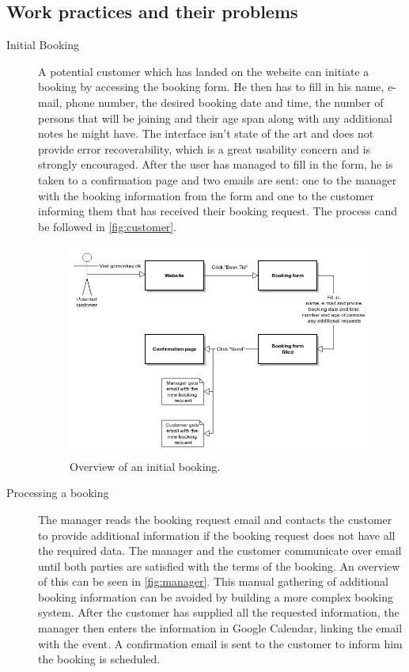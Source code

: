 \subsection{Work practices and their problems}
\begin{description}
\item[Initial Booking]
A potential customer which has landed on the website can initiate a booking
by accessing the booking form. He then has to fill in his name, e-mail, phone number, 
the desired booking date and time, the number of persons that will be joining and their
age span along with any additional notes he might have. The interface isn't state of the art 
and does not provide error recoverability, which is a great usability concern and is 
strongly encouraged. After the user has managed to fill in the form, he is taken to a confirmation
page and two emails are sent: one to the manager with the booking information from the form and
one to the customer informing them that \gomonkey  has received their booking request. The process
cand be followed in \autoref{fig:customer}.

\begin{figure}[htbp]
    \centering
        \includegraphics[width=\textwidth]{figures/customer.png}
            \caption{Overview of an initial booking.}
        \label{fig:customer}
\end{figure}

\item[Processing a booking]
The manager reads the booking request email and contacts the customer to provide additional
information if the booking request does not have all the required data. The manager and the 
customer communicate over email until both parties are satisfied with the terms of the booking.
An overview of this can be seen in \autoref{fig:manager}. This manual gathering of additional
booking information can be avoided by building a more complex booking system. After the customer
has supplied all the requested information, the manager then enters the information in Google
Calendar, linking the email with the event. A confirmation email is sent to the customer to
inform him the booking is scheduled.


\end{description}
